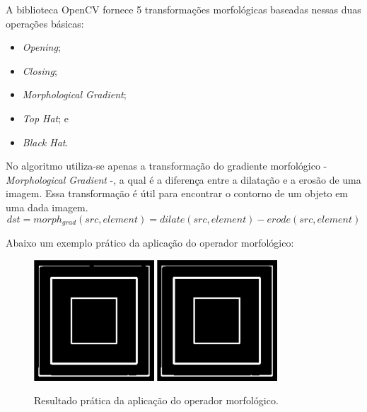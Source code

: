 A biblioteca OpenCV fornece 5 transformações morfológicas baseadas nessas duas operações básicas:
\begin{itemize}
    \item \textit{Opening};
    \item \textit{Closing};
    \item \textit{Morphological Gradient};
    \item \textit{Top Hat}; e 
    \item \textit{Black Hat}.
\end{itemize} 
\clearpage


No algoritmo utiliza-se apenas a transformação do gradiente morfológico - \textit{Morphological Gradient} -, a qual é a diferença entre a dilatação e a erosão de uma imagem. Essa transformação é útil para encontrar o contorno de um objeto em uma dada imagem. \citep{morphology_transformations}
\[dst = morph_{grad}( src, element ) = dilate( src, element ) - erode( src, element )\]

Abaixo um exemplo prático da aplicação do operador morfológico: 
\begin{figure}[!htb]
 \centering
 \def\baselinestretch{1}\small\normalsize
 \includegraphics[width=0.4\textwidth]{img/org.png}\qquad
 \includegraphics[width=0.4\textwidth]{img/op_morf.png} 
 \caption{\label{fig:lena_sobel}Resultado prática da aplicação do operador morfológico.}
\end{figure}   


